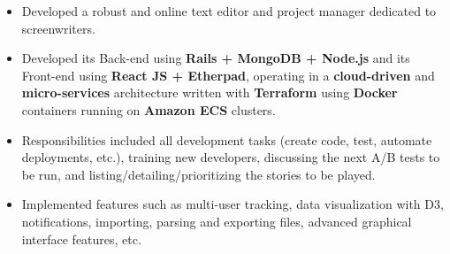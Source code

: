 \documentclass[10pt,a4paper,ragged2e]{altacv}
\begin{document}

\begin{fullwidth}
\makecvheader%
\end{fullwidth}



\begin{itemize}
\item Developed a robust and online text editor and project manager dedicated to screenwriters.
\item Developed its Back-end using \textbf{Rails + MongoDB + Node.js} and its Front-end using \textbf{React JS + Etherpad}, operating in a \textbf{cloud-driven} and \textbf{micro-services} architecture written with \textbf{Terraform} using \textbf{Docker} containers running on \textbf{Amazon ECS} clusters.
\item Responsibilities included all development tasks (create code, test, automate deployments, etc.), training new developers, discussing the next A/B tests to be run, and listing/detailing/prioritizing the stories to be played.
\item Implemented features such as multi-user tracking, data visualization with D3, notifications, importing, parsing and exporting files, advanced graphical interface features, etc.
\end{itemize}
\end{document}

